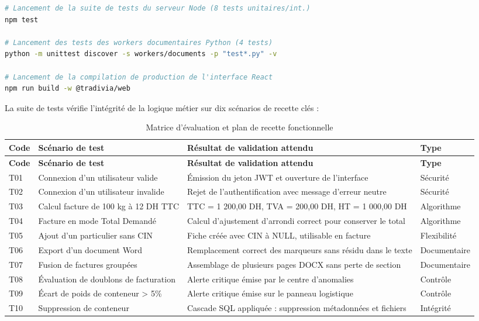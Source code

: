 \documentclass[12pt,a4paper,oneside]{report}
\begin{document}
\begin{lstlisting}[language=bash,caption={Validation globale du système}]
# Lancement de la suite de tests du serveur Node (8 tests unitaires/int.)
npm test

# Lancement des tests des workers documentaires Python (4 tests)
python -m unittest discover -s workers/documents -p "test*.py" -v

# Lancement de la compilation de production de l'interface React
npm run build -w @tradivia/web
\end{lstlisting}

La suite de tests vérifie l'intégrité de la logique métier sur dix scénarios de recette clés :

\begin{longtable}{p{1.3cm}p{5.3cm}p{6.2cm}p{2cm}}
\caption{Matrice d'évaluation et plan de recette fonctionnelle}\label{tab:recette}\\
\toprule
\textbf{Code} & \textbf{Scénario de test} & \textbf{Résultat de validation attendu} & \textbf{Type}\\
\midrule
\endfirsthead
\toprule
\textbf{Code} & \textbf{Scénario de test} & \textbf{Résultat de validation attendu} & \textbf{Type}\\
\midrule
\endhead
T01 & Connexion d'un utilisateur valide & Émission du jeton JWT et ouverture de l'interface & Sécurité\\
T02 & Connexion d'un utilisateur invalide & Rejet de l'authentification avec message d'erreur neutre & Sécurité\\
T03 & Calcul facture de 100 kg à 12 DH TTC & TTC = 1 200,00 DH, TVA = 200,00 DH, HT = 1 000,00 DH & Algorithme\\
T04 & Facture en mode Total Demandé & Calcul d'ajustement d'arrondi correct pour conserver le total & Algorithme\\
T05 & Ajout d'un particulier sans CIN & Fiche créée avec CIN à NULL, utilisable en facture & Flexibilité\\
T06 & Export d'un document Word & Remplacement correct des marqueurs sans résidu dans le texte & Documentaire\\
T07 & Fusion de factures groupées & Assemblage de plusieurs pages DOCX sans perte de section & Documentaire\\
T08 & Évaluation de doublons de facturation & Alerte critique émise par le centre d'anomalies & Contrôle\\
T09 & Écart de poids de conteneur > 5\% & Alerte critique émise sur le panneau logistique & Contrôle\\
T10 & Suppression de conteneur & Cascade SQL appliquée : suppression métadonnées et fichiers & Intégrité\\
\bottomrule
\end{longtable}
\end{document}
